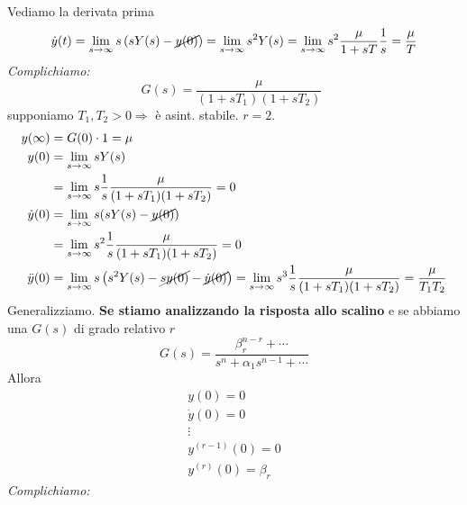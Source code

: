 \documentclass[10pt,a4paper]{book}
\begin{document}
Vediamo la derivata prima
\begin{equation*}
\dot{y}(t) =\lim _{s\rightarrow \infty } s\left( sY( s) -\cancel{y( 0)}\right) =\lim _{s\rightarrow \infty } s^2 Y( s) =\lim _{s\rightarrow \infty } s^2\frac{\mu }{1+sT}\frac{1}{s} =\frac{\mu }{T}
\end{equation*}
\textit{Complichiamo:}
\begin{equation*}
G(s)=\frac{\mu }{( 1+sT_1)( 1+sT_2)} \ \ 
\end{equation*}
supponiamo $T_1 ,T_2  >0\Rightarrow $ è asint. stabile. $r=2$.
\begin{equation*}
\begin{aligned}
y(\infty ) & =G(0)\cdot 1=\mu \\
y(0) & =\lim _{s\rightarrow \infty } sY(s)\\
 & =\lim _{s\rightarrow \infty } s\frac{1}{s}\frac{\mu }{( 1+sT_1)( 1+sT_2)} =0\\
\dot{y} (0) & =\lim _{s\rightarrow \infty } s(sY(s)-\cancel{y(0)} )\\
 & =\lim _{s\rightarrow \infty } s^2\frac{1}{s}\frac{\mu }{( 1+sT_1)( 1+sT_2)} =0\\
\ddot{y} (0) & =\lim _{s\rightarrow \infty } s\left( s^2 Y(s)-\cancel{sy(0)} -\cancel{\dot{y} (0)}\right) =\lim _{s\rightarrow \infty } s^3\frac{1}{s}\frac{\mu }{( 1+sT_1)( 1+sT_2)} =\frac{\mu }{T_1 T_2}
\end{aligned}
\end{equation*}
Generalizziamo. \textbf{Se stiamo analizzando la risposta allo scalino} e se abbiamo una $G( s)$ di grado relativo $r$
\begin{equation*}
G( s) =\frac{\beta ^{n-r}_r +\cdots }{s^n +\alpha _1 s^{n-1} +\cdots }
\end{equation*}
Allora
\begin{equation*}
\boxed{\begin{array}{ c }
y( 0) =0\\
\dot{y}( 0) =0\\
\vdots \\
y^{( r-1)}( 0) =0\\
y^{( r)}( 0) =\beta _r
\end{array}}
\end{equation*}
\textit{Complichiamo:}
\end{document}

